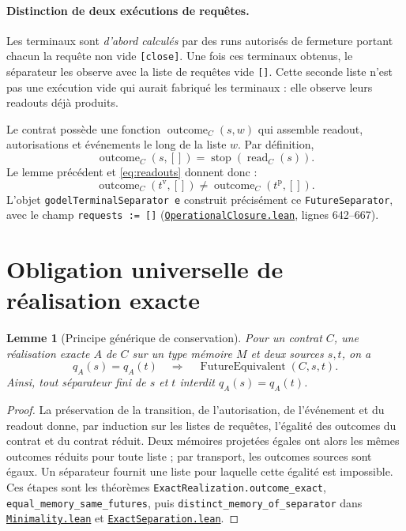 \documentclass[11pt,a4paper]{article}
\newcommand{\FutureEquivalent}{\operatorname{FutureEquivalent}}
\newcommand{\code}[1]{\nolinkurl{#1}}
\newcommand{\SourceAt}[3]{\href{https://github.com/JohnDoe-collab-stack/relational-perimeter/blob/1e5aeda745559d62a3819bb3213da7fce3c31ad1/#1\#L#2}{\nolinkurl{#3}}}
\newtheorem{lemme}[theoreme]{Lemme}
\theoremstyle{remark}
\begin{document}
\paragraph{Distinction de deux exécutions de requêtes.}
Les terminaux sont \emph{d'abord calculés} par des runs autorisés de fermeture
portant chacun la requête non vide \code{[close]}. Une fois ces terminaux
obtenus, le séparateur les observe avec la liste de requêtes vide
\code{[]}. Cette seconde liste n'est pas une exécution vide qui aurait
fabriqué les terminaux : elle observe leurs readouts déjà produits.

Le contrat possède une fonction $\operatorname{outcome}_C(s,w)$ qui
assemble readout, autorisations et événements le long de la liste $w$.
Par définition,
\[
\operatorname{outcome}_C(s,[]) =
  \operatorname{stop}(\operatorname{read}_C(s)).
\]
Le lemme précédent et \eqref{eq:readouts} donnent donc :
\begin{equation}\label{eq:separator}
\operatorname{outcome}_{C}(t^{\mathrm v},[])
\neq\operatorname{outcome}_{C}(t^{\mathrm p},[]).
\end{equation}
L'objet \code{godelTerminalSeparator e} construit précisément ce
\code{FutureSeparator}, avec le champ \code{requests := []}
(\SourceAt{RelationalPerimeter/Constitution/Godel/OperationalClosure.lean}{642-L667}{OperationalClosure.lean},
lignes 642--667).

\section{Obligation universelle de réalisation exacte}
\label{sec:theorem}

\begin{lemme}[Principe générique de conservation]\label{lem:generic}
Pour un contrat $C$, une réalisation exacte $A$ de $C$ sur un type mémoire
$M$ et deux sources $s,t$, on a
\[
q_A(s)=q_A(t)\quad\Longrightarrow\quad
\FutureEquivalent(C,s,t).
\]
Ainsi, tout séparateur fini de $s$ et $t$ interdit $q_A(s)=q_A(t)$.
\end{lemme}
\begin{proof}
La préservation de la transition, de l'autorisation, de l'événement et du
readout donne, par induction sur les listes de requêtes, l'égalité des
outcomes du contrat et du contrat réduit. Deux mémoires projetées égales
ont alors les mêmes outcomes réduits pour toute liste ; par transport,
les outcomes sources sont égaux. Un séparateur fournit une liste pour
laquelle cette égalité est impossible. Ces étapes sont les théorèmes
\code{ExactRealization.outcome\_exact},
\code{equal\_memory\_same\_futures}, puis
\code{distinct\_memory\_of\_separator} dans
\SourceAt{RelationalPerimeter/Constitution/Continuation/Minimality.lean}{56-L75}{Minimality.lean}
et \SourceAt{RelationalPerimeter/Constitution/Continuation/ExactSeparation.lean}{20-L27}{ExactSeparation.lean}.
\end{proof}
\end{document}
